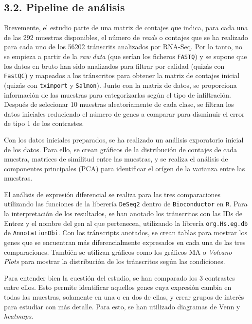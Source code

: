 \documentclass[
]{article}
\begin{document}
\hypertarget{pipeline-de-anuxe1lisis}{%
\subsection{3.2. Pipeline de análisis}\label{pipeline-de-anuxe1lisis}}

Brevemente, el estudio parte de una matriz de contajes que indica, para
cada una de las 292 muestras disponibles, el número de \emph{reads} o
contajes que se ha realizado para cada uno de los 56202 tránscrits
analizados por RNA-Seq. Por lo tanto, no se empieza a partir de la
\emph{raw data} (que serían los ficheros \texttt{FASTQ}) y se supone que
los datos en bruto han sido analizados para filtrar por calidad (quizás
con \texttt{FastQC}) y mapeados a los tránscritos para obtener la matriz
de contajes inicial (quizás con \texttt{tximport} y \texttt{Salmon}).
Junto con la matriz de datos, se proporciona información de las muestras
para categorizarlas según el tipo de infiltración. Después de selecionar
10 muestras aleatoriamente de cada clase, se filtran los datos iniciales
reduciendo el número de genes a comparar para disminuir el error de tipo
1 de los contrastes.

Con los datos iniciales preparados, se ha realizado un análisis
exporatorio inicial de los datos. Para ello, se crean gráficos de la
distribución de contajes de cada muestra, matrices de similitud entre
las muestras, y se realiza el análisis de componentes principales (PCA)
para identificar el orígen de la varianza entre las muestras.

El análisis de expresión diferencial se realiza para las tres
comparaciones utilizando las funciones de la liberería \texttt{DeSeq2}
dentro de \texttt{Bioconductor} en \texttt{R}. Para la interpretación de
los resultados, se han anotado los tránscritos con las IDs de Entrez y
el nombre del gen al que pertenecen, utilizando la librería
\texttt{org.Hs.eg.db} de \texttt{AnnotationDbi}. Con los tránscripts
anotados, se crean tablas para mostrar los genes que se encuentran más
diferencialmente expresados en cada una de las tres comparaciones.
También se utilizan gráficos como los gráficos MA o \emph{Volcano Plots}
para mostrar la distribución de los tránscritos según las condiciones.

Para entender bien la cuestión del estudio, se han comparado los 3
contrastes entre ellos. Esto permite identificar aquellos genes cuya
expresión cambia en todas las muestras, solamente en una o en dos de
ellas, y crear grupos de interés para estudiar con más detalle. Para
esto, se han utilizado diagramas de Venn y \emph{heatmaps}.
\end{document}

